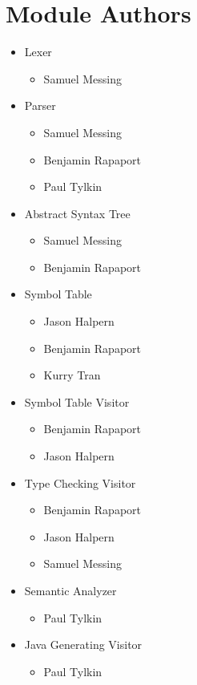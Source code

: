 \documentclass{report}
\begin{document}
\section{Module Authors}
\begin{itemize}
  \item Lexer
    \begin{itemize}
      \item Samuel Messing
    \end{itemize}
    
    \item Parser
    \begin{itemize}
      \item Samuel Messing
      \item Benjamin Rapaport
      \item Paul Tylkin
    \end{itemize}
    
     \item Abstract Syntax Tree
    \begin{itemize}
      \item Samuel Messing
      \item Benjamin Rapaport
    \end{itemize}
    
     \item Symbol Table
    \begin{itemize}
      \item Jason Halpern
      \item Benjamin Rapaport
      \item Kurry Tran
    \end{itemize}
    
     \item Symbol Table Visitor
    \begin{itemize}
      \item Benjamin Rapaport
      \item Jason Halpern
    \end{itemize}
    
    \item Type Checking Visitor
    \begin{itemize}
      \item Benjamin Rapaport
      \item Jason Halpern
      \item Samuel Messing
    \end{itemize}
    
    \item Semantic Analyzer
    \begin{itemize}
      \item Paul Tylkin
    \end{itemize}
    
    \item Java Generating Visitor
    \begin{itemize}
      \item Paul Tylkin
    \end{itemize}
    
    
\end{itemize}
\end{document}
